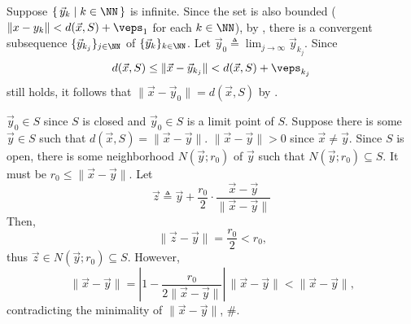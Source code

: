 \documentclass[MAS241_Note.tex]{subfiles}
\begin{document}
{\begin{enumerate}[nolistsep, label=(\roman*)]
            Suppose $\{\,\vec y_k \mid k \in \NN\,\}$ is infinite.
            Since the set is also bounded ($\|x-y_k\| < d(\vec x, S) + \veps_1$ for each $k \in \NN$),
            by , there is a convergent subsequence $\{\vec y_{k_j}\}_{j \in \NN}$ of $\{\vec y_k\}_{k \in \NN}$.
            Let $\vec y_0 \triangleq \lim_{j \to \infty} \vec y_{k_j}$. Since \[
                d(\vec x, S) \le \|\vec x-\vec y_{k_j}\| < d(\vec x, S) + \veps_{k_j}
            \] still holds, it follows that $\|\vec x-\vec y_0\| = d(\vec x, S)$ by .

            $\vec y_0 \in S$ since $S$ is closed and $\vec y_0 \in S$ is a limit point of $S$. \checkmark
        \ii Suppose there is some $\vec y \in S$ such that $d(\vec x, S) = \|\vec x-\vec y\|$.
            $\|\vec x - \vec y\| > 0$ since $\vec x \neq \vec y$.
            Since $S$ is open, there is some neighborhood $N(\vec y; r_0)$ of $\vec y$ such that $N(\vec y; r_0) \subseteq S$.
            It must be $r_0 \le \|\vec x - \vec y\|$. Let \[
                \vec z \triangleq \vec y + \frac{r_0}{2} \cdot \frac{\vec x - \vec y}{\|\vec x - \vec y\|}
            \]
            Then, \[
                \|\vec z - \vec y\| = \frac{r_0}{2} < r_0\text{,}
            \] thus $\vec z \in N(\vec y; r_0) \subseteq S$. However, \[
                \|\vec x - \vec y\| = \left| 1 - \frac{r_0}{2\|\vec x-\vec y\|} \right|\,\|\vec x-\vec y\| < \|\vec x - \vec y\|\text{,}
            \] contradicting the minimality of $\|\vec x- \vec y\|$, \#. \checkmark
    \end{enumerate}
}

\end{document}
